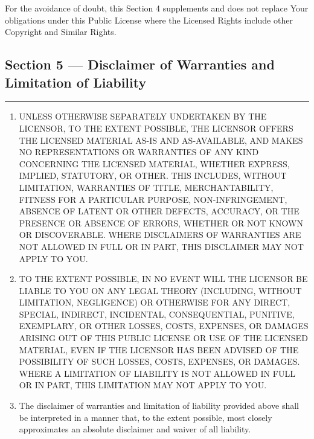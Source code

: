 For the avoidance of doubt, this Section 4 supplements and does not replace Your obligations under this Public License where the Licensed Rights include other Copyright and Similar Rights.

\subsection*{Section 5 --- Disclaimer of Warranties and Limitation of Liability}
\noindent\rule{\textwidth}{0.3pt}
\smallskip

\begin{enumerate}[label=(\alph*), leftmargin=1.8em, labelwidth=1.5em, align=left, itemsep=0.5em]
	\item UNLESS OTHERWISE SEPARATELY UNDERTAKEN BY THE LICENSOR, TO THE EXTENT POSSIBLE, THE LICENSOR OFFERS THE LICENSED MATERIAL AS-IS AND AS-AVAILABLE, AND MAKES NO REPRESENTATIONS OR WARRANTIES OF ANY KIND CONCERNING THE LICENSED MATERIAL, WHETHER EXPRESS, IMPLIED, STATUTORY, OR OTHER. THIS INCLUDES, WITHOUT LIMITATION, WARRANTIES OF TITLE, MERCHANTABILITY, FITNESS FOR A PARTICULAR PURPOSE, NON-INFRINGEMENT, ABSENCE OF LATENT OR OTHER DEFECTS, ACCURACY, OR THE PRESENCE OR ABSENCE OF ERRORS, WHETHER OR NOT KNOWN OR DISCOVERABLE. WHERE DISCLAIMERS OF WARRANTIES ARE NOT ALLOWED IN FULL OR IN PART, THIS DISCLAIMER MAY NOT APPLY TO YOU.
	\item TO THE EXTENT POSSIBLE, IN NO EVENT WILL THE LICENSOR BE LIABLE TO YOU ON ANY LEGAL THEORY (INCLUDING, WITHOUT LIMITATION, NEGLIGENCE) OR OTHERWISE FOR ANY DIRECT, SPECIAL, INDIRECT, INCIDENTAL, CONSEQUENTIAL, PUNITIVE, EXEMPLARY, OR OTHER LOSSES, COSTS, EXPENSES, OR DAMAGES ARISING OUT OF THIS PUBLIC LICENSE OR USE OF THE LICENSED MATERIAL, EVEN IF THE LICENSOR HAS BEEN ADVISED OF THE POSSIBILITY OF SUCH LOSSES, COSTS, EXPENSES, OR DAMAGES. WHERE A LIMITATION OF LIABILITY IS NOT ALLOWED IN FULL OR IN PART, THIS LIMITATION MAY NOT APPLY TO YOU.
	\item The disclaimer of warranties and limitation of liability provided above shall be interpreted in a manner that, to the extent possible, most closely approximates an absolute disclaimer and waiver of all liability.
\end{enumerate}

